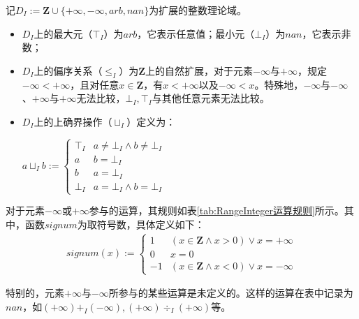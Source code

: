 \begin{definition}
	记$ D_I := \mathbf{Z} \cup \{ +\infty, -\infty, arb, nan\}  $为扩展的整数理论域。
	\begin{itemize}
		\item $ D_I $上的最大元（$ \top_I $）为$ arb $，它表示任意值；最小元（$ \bot_I $）为$ nan $，它表示非数；
		
		\item $ D_I $上的偏序关系（$ \le_I $）为$ \mathbf{Z} $上的自然扩展，对于元素$ -\infty $与$ +\infty $，规定$ -\infty < +\infty $，且对任意$ x \in \mathbf{Z} $，有$ x < +\infty $以及$ -\infty < x $。特殊地，$ -\infty $与$ -\infty $、$ +\infty $与$ +\infty $无法比较，$ \bot_I, \top_I $与其他任意元素无法比较。
		
		\item $ D_I $上的上确界操作（$ \sqcup_I $）定义为：\\
		\centerline{$ a \sqcup_I b := \begin{cases}
			\top_I & a \ne \bot_I \land b \ne \bot_I\\
			a & b = \bot_I\\
			b & a = \bot_I\\
			\bot_I & a = \bot_I \land b = \bot_I
			\end{cases} $}
	\end{itemize}
\end{definition}

对于元素$ -\infty $或$ +\infty $参与的运算，其规则如表\ref{tab:RangeInteger运算规则}所示。其中，函数$ signum $为取符号数，具体定义如下：
\begin{align}
	signum(x) := \begin{cases}
		1 & (x \in \mathbf{Z} \land x > 0) \lor x = +\infty\\
		0 & x = 0\\
		-1 & (x \in \mathbf{Z} \land x < 0) \lor x = -\infty
	\end{cases}
\end{align}

特别的，元素$ +\infty $与$ -\infty $所参与的某些运算是未定义的。这样的运算在表中记录为$ nan $，如$ (+\infty) +_I (-\infty), (+\infty) \div_I (+\infty)  $等。

